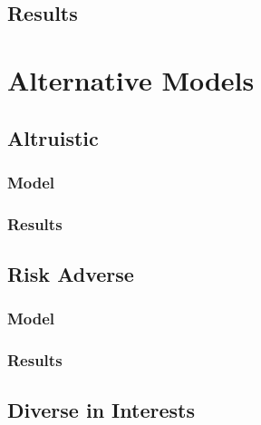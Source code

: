 \documentclass[acmlarge]{acmart}
\begin{document}
\subsection{Results}

\section{Alternative Models}

\subsection{Altruistic}
\subsubsection{Model}
\subsubsection{Results}

\subsection{Risk Adverse}
\subsubsection{Model}
\subsubsection{Results}

\subsection{Diverse in Interests}
\end{document}
